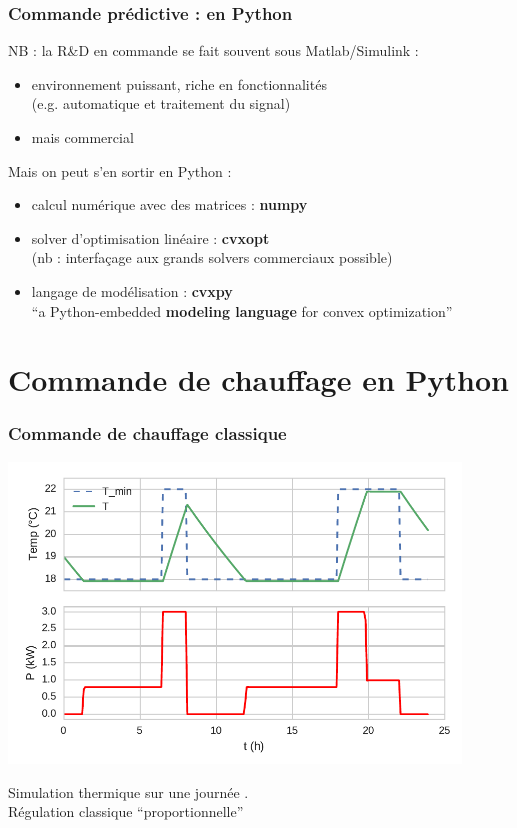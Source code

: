 \begin{frame}
  \frametitle{Commande prédictive : en Python}
  
  NB : la R\&D en commande se fait souvent sous Matlab/Simulink :
  \begin{itemize}
   \item environnement puissant, riche en fonctionnalités \\(e.g. automatique et traitement du signal)
   \item mais commercial 
  \end{itemize}

  \bigskip \pause
  
  Mais on peut s'en sortir en Python :
  
  \begin{itemize}
   \item calcul numérique avec des matrices : \textbf{numpy}
   \item solver d'optimisation linéaire : \textbf{cvxopt}\\
   (nb : interfaçage aux grands solvers commerciaux possible)
   \item langage de modélisation : \textbf{cvxpy}\\
   {\footnotesize ``a Python-embedded \textbf{modeling language} for convex optimization''}
  \end{itemize}

  \bigskip
\end{frame}


\section{Commande de chauffage en Python}

\begin{frame}
  \frametitle{Commande de chauffage classique}
 
  \begin{center}
    \includegraphics[width=0.9\textwidth]{notebook/sim_Prop_fback.pdf}
    
    \footnotesize
     Simulation thermique sur une journée .\\
     Régulation classique ``proportionnelle''
  \end{center}
\end{frame}

